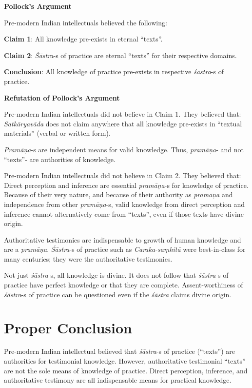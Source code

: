 {\bf Pollock's Argument}

Pre-modern Indian intellectuals believed the following:

{\bf Claim 1}: All knowledge pre-exists in eternal ``texts''.  

{\bf Claim 2}: {\sl Śāstra}-s of practice are eternal ``texts'' for their respective domains.

{\bf Conclusion}:  All knowledge of practice pre-exists in respective {\sl śāstra}-s of practice. 

\newpage

{\bf Refutation of Pollock's Argument}

Pre-modern Indian intellectuals did not believe in Claim 1.  They believed that:
\textsl{Satkāryavāda} does not claim anywhere that all knowledge pre-exists in ``textual materials'' (verbal or written form).

\textsl{Pramāņa}-s are independent means for valid knowledge. Thus, {\sl pramāṇa}- and not ``texts''- are authorities of knowledge.

Pre-modern Indian intellectuals did not believe in Claim 2.  They believed that:
Direct perception and inference are essential {\sl pramāṇa}-s for knowledge of practice.  Because of their very nature, and because of their authority as {\sl pramāṇa} and independence from other {\sl pramāṇa}-s, valid knowledge from direct perception and inference cannot alternatively come from ``texts'', even if those texts have divine origin.

Authoritative testimonies are indispensable to growth of human knowledge and are a {\sl pramāṇa}.  {\sl Śāstra}-s of practice such as {\sl Caraka-saṃhitā} were best-in-class for many centuries; they were the authoritative testimonies.

Not just {\sl śāstra}-s, all knowledge is divine. It does not follow that {\sl śāstra}-s of practice have perfect knowledge or that they are complete.
Assent-worthiness of {\sl śāstra}-s of practice can be questioned even if the {\sl śāstra} claims divine origin.

\section*{Proper Conclusion}

Pre-modern Indian intellectual believed that {\sl śāstra}-s of practice (``texts'') are authorities for testimonial knowledge. However, authoritative testimonial ``texts'' are not the sole means of knowledge of practice. Direct perception, inference, and authoritative testimony are all indispensable means for practical knowledge.

